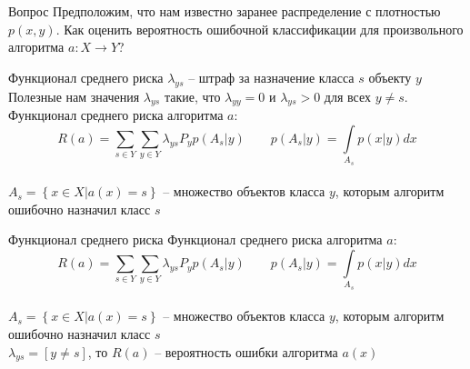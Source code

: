 \documentclass[10pt]{beamer}
\begin{document}
\begin{frame}{Вопрос}
  \centering
  Предположим, что нам известно заранее распределение с плотностью $p(x, y)$. Как оценить вероятность ошибочной классификации для произвольного алгоритма $a: X \rightarrow Y$?
\end{frame}

\begin{frame}{Функционал среднего риска}
  $\lambda_{ys}$ -- штраф за назначение класса $s$ объекту $y$\\
  \pause
  \bigbreak
  \alert{Полезные} нам значения $\lambda_{ys}$ такие, что $\lambda_{yy} = 0$ и $\lambda_{ys} > 0$ для всех $y \neq s$.
  \pause
  \bigbreak
  Функционал среднего риска алгоритма $a$:\\
  $$R(a) = \sum\limits_{s \in Y} \sum\limits_{y \in Y} \lambda_{ys} P_y p(A_s|y) \qquad p(A_s|y) = \int\limits_{A_s} p(x|y) dx$$\\
  $A_s = \left\{ x \in X | a(x) = s \right\}$ -- множество объектов класса $y$, которым алгоритм ошибочно назначил класс $s$
\end{frame}

\begin{frame}{Функционал среднего риска}
  Функционал среднего риска алгоритма $a$:\\
  $$R(a) = \sum\limits_{s \in Y} \sum\limits_{y \in Y} \lambda_{ys} P_y p(A_s|y) \qquad p(A_s|y) = \int\limits_{A_s} p(x|y) dx$$\\
  $A_s = \left\{ x \in X | a(x) = s \right\}$ -- множество объектов класса $y$, которым алгоритм ошибочно назначил класс $s$\\
  \bigbreak
  \pause
  $\lambda_{ys} = \left[ y \neq s \right]$, то $R(a)$ -- вероятность ошибки алгоритма $a(x)$
\end{frame}
\end{document}
